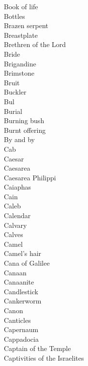 Book of life  \\
Bottles  \\
Brazen serpent  \\
Breastplate  \\
Brethren of the Lord  \\
Bride  \\
Brigandine  \\
Brimstone  \\
Bruit  \\
Buckler  \\
Bul  \\
Burial  \\
Burning bush  \\
Burnt offering  \\
By and by  \\
Cab  \\
Caesar  \\
Caesarea  \\
Caesarea Philippi  \\
Caiaphas  \\
Cain  \\
Caleb  \\
Calendar  \\
Calvary  \\
Calves  \\
Camel  \\
Camel’s hair  \\
Cana of Galilee  \\
Canaan  \\
Canaanite  \\
Candlestick  \\
Cankerworm  \\
Canon  \\
Canticles  \\
Capernaum  \\
Cappadocia  \\
Captain of the Temple  \\
Captivities of the Israelites  \\
